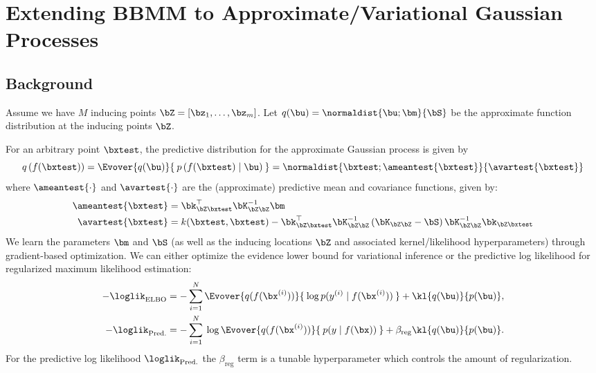 \chapter{Extending BBMM to Approximate/Variational Gaussian Processes}
\label{chapter:ciq}

\section{Background}

Assume we have $M$ inducing points $\bZ = [\bz_1, \ldots, \bz_m]$.
Let $q(\bu) = \normaldist{\bu; \bm}{\bS}$ be the approximate function distribution at the inducing points $\bZ$.

For an arbitrary point $\bxtest$, the predictive distribution for the approximate Gaussian process is given by
%
\begin{equation}
  q \left( f(\bxtest) \right) = \Evover{q(\bu)}{ \: p\left( f(\bxtest) \mid \bu \right) \: }
  = \normaldist{ \bxtest; \ameantest{ \bxtest }} { \avartest{ \bxtest }}
  \label{eqn:approx_pred}
\end{equation}
%
where $\ameantest{\cdot}$ and $\avartest{\cdot}$ are the (approximate) predictive mean and covariance functions, given by:
%
\begin{align}
  \ameantest{\bxtest} &= \bk_{\bZ\bxtest}^\top \bK_{\bZ\bZ}^{-1} \bm
  \label{eqn:approx_pred_mean} \\
  \avartest{\bxtest} &= k(\bxtest, \bxtest) -
    \bk_{\bZ\bxtest}^\top \bK_{\bZ\bZ}^{-1} \left( \bK_{\bZ\bZ} - \bS \right) \bK_{\bZ\bZ}^{-1} \bk_{\bZ\bxtest}
  \label{eqn:approx_pred_covar}
\end{align}
%
We learn the parameters $\bm$ and $\bS$ (as well as the inducing locations $\bZ$ and associated kernel/likelihood hyperparameters) through gradient-based optimization.
We can either optimize the evidence lower bound \cite{hensman2015scalable} for variational inference or the predictive log likelihood \cite{jankowiak2020parametric} for regularized maximum likelihood estimation:
%
\begin{align}
	-\loglik_\text{ELBO} &= -\sum_{i=1}^N \Evover{q(f(\bx^{(i)}))}{  \: \log p( y^{(i)} \mid f(\bx^{(i)}) ) \: } + \kl{ q(\bu) }{ p(\bu) },
	\label{eqn:elbo}
	\\
	-\loglik_\text{Pred.} &= -\sum_{i=1}^N \: \log \Evover{q(f(\bx^{(i)}))}{  \: p( y \mid f(\bx) ) \: } + \beta_\text{reg} \kl{ q(\bu) }{ p(\bu) }.
	\label{eqn:predll}
\end{align}
%
For the predictive log likelihood $\loglik_\text{Pred.}$ the $\beta_\text{reg}$ term is a tunable hyperparameter which controls the amount of regularization.



